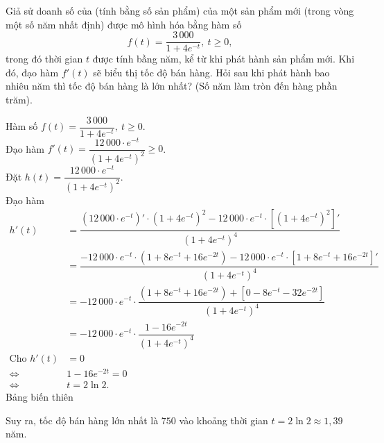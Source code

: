 \begin{ex}%
	Giả sử doanh số của (tính bằng số sản phẩm) của một sản phẩm mới (trong vòng một số năm nhất định) được mô hình hóa bằng hàm số 
	$$f(t) = \dfrac{3\,000}{1+4e^{-t}},\ t \ge 0,$$
	trong đó thời gian $t$ được tính bầng năm, kể từ khi phát hành sản phẩm mới. Khi đó, đạo hàm $f'(t)$ sẽ biểu thị tốc độ bán hàng. Hỏi sau khi phát hành bao nhiêu năm thì tốc độ bán hàng là lớn nhất? (Số năm làm tròn đến hàng phần trăm).
	
	\loigiai
	{
		Hàm số $f(t) = \dfrac{3\,000}{1+4e^{-t}},\ t \ge 0$.\\
		Đạo hàm $f'(t) = \dfrac{12\,000\cdot e^{-t}}{(1+4e^{-t})^{2}}\ge 0$.\\
		Đặt $h(t) = \dfrac{12\,000\cdot e^{-t}}{(1+4e^{-t})^{2}}$.\\
		Đạo hàm 
		\begin{align*}
			h'(t) &= \dfrac{\left(12\,000 \cdot e^{-t}\right)' \cdot (1+4e^{-t})^{2} - 12\,000 \cdot e^{-t} \cdot  \left[(1+4e^{-t})^{2}\right]'}{(1+4e^{-t})^{4}}\\
			&= \dfrac{-12\,000 \cdot e^{-t} \cdot (1 + 8e^{-t} + 16e^{-2t}) - 12\,000 \cdot e^{-t} \cdot  \left[1 + 8e^{-t} + 16e^{-2t}\right]'}{(1+4e^{-t})^{4}}\\
			&= -12\,000 \cdot e^{-t} \cdot \dfrac{(1 + 8e^{-t} + 16e^{-2t}) + \left[0 - 8e^{-t} - 32e^{-2t}\right]}{(1+4e^{-t})^{4}}\\
			&= -12\,000 \cdot e^{-t} \cdot \dfrac{1 - 16e^{-2t}}{(1+4e^{-t})^{4}}\\
			\text{Cho }h'(t) &=0\\
			\Leftrightarrow &1-16e^{-2t} = 0\\
			\Leftrightarrow &t=2\ln 2.
		\end{align*}
		Bảng biến thiên
		\begin{center}
		\end{center}
		Suy ra, tốc độ bán hàng lớn nhất là $750$ vào khoảng thời gian $t=2\ln 2 \approx 1{,}39$ năm.
	}
\end{ex}

